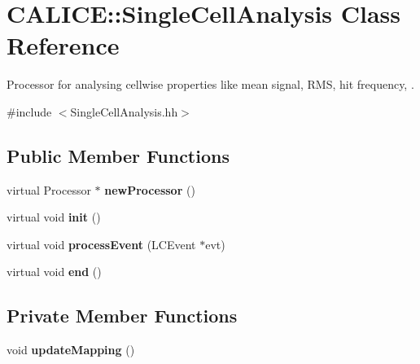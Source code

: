 \section{CALICE::SingleCellAnalysis Class Reference}
\label{classCALICE_1_1SingleCellAnalysis}


Processor for analysing cellwise properties like mean signal, RMS, hit frequency, .  


{\ttfamily \#include $<$SingleCellAnalysis.hh$>$}\subsection*{Public Member Functions}
\begin{DoxyCompactItemize}
\item 
virtual Processor $\ast$ {\bfseries newProcessor} ()\label{classCALICE_1_1SingleCellAnalysis_a3bbce1e034c8128d3ebbe5458500bbd6}

\item 
virtual void {\bfseries init} ()\label{classCALICE_1_1SingleCellAnalysis_a6c48b1978e7397423867c299610f7674}

\item 
virtual void {\bfseries processEvent} (LCEvent $\ast$evt)\label{classCALICE_1_1SingleCellAnalysis_a047a203f24f82572248c0acae8514257}

\item 
virtual void {\bfseries end} ()\label{classCALICE_1_1SingleCellAnalysis_a7a5e0996495546514a5974d9ea3c5ce9}

\end{DoxyCompactItemize}
\subsection*{Private Member Functions}
\begin{DoxyCompactItemize}
\item 
void {\bfseries updateMapping} ()\label{classCALICE_1_1SingleCellAnalysis_a432527a7d5023108adb6028e544786c4}

\end{DoxyCompactItemize}
